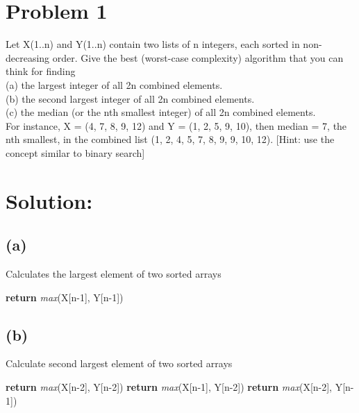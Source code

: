 	\newdimen\boxitspace\boxitspace=3pt%
	\long\def\boxit#1{\vbox{\hrule\hbox{\vrule\kern\boxitspace\vbox{%
					\kern\boxitspace\parindent0pt#1\kern\boxitspace}%
				\kern\boxitspace\vrule}\hrule}}
	\def\aryitem#1{\boxit{\hbox to 1.4em{\hfil#1\hfil}}}%
	\let\MS\multispan%

    \section*{Problem 1}
    \noindent
    Let X(1..n) and Y(1..n) contain two lists of n integers, each sorted in non-decreasing order. Give the best (worst-case complexity) algorithm that you can think for finding \\
    (a) the largest integer of all 2n combined elements.\\
    (b) the second largest integer of all 2n combined elements.\\
    (c) the median (or the nth smallest integer) of all 2n combined elements.\\
    For instance, X = (4, 7, 8, 9, 12) and Y = (1, 2, 5, 9, 10), then median = 7, the nth smallest, in the combined list (1, 2, 4, 5, 7, 8, 9, 9, 10, 12). [Hint: use the concept similar to binary search]

    \section*{Solution:}
    	\subsection*{(a)}
  				\begin{algorithm}[H]
  					\caption{Calculates the largest element of two sorted arrays}
  					\begin{algorithmic}[1]
  						\State \textbf{return} \textit{max}(X[n-1], Y[n-1])
  						\EndProcedure
  					\end{algorithmic}
  				\end{algorithm}
  		\subsection*{(b)}
  			\begin{algorithm}[H]
  				\caption{Calculate second largest element of two sorted arrays}
  				\begin{algorithmic}[1]
  					\State\textbf{return} \textit{max}(X[n-2], Y[n-2])
  					\State\textbf{return} \textit{max}(X[n-1], Y[n-2])
  					\Else
  					\State\textbf{return} \textit{max}(X[n-2], Y[n-1])
  					\EndIf
  					\EndProcedure
  				\end{algorithmic}
  			\end{algorithm}	
